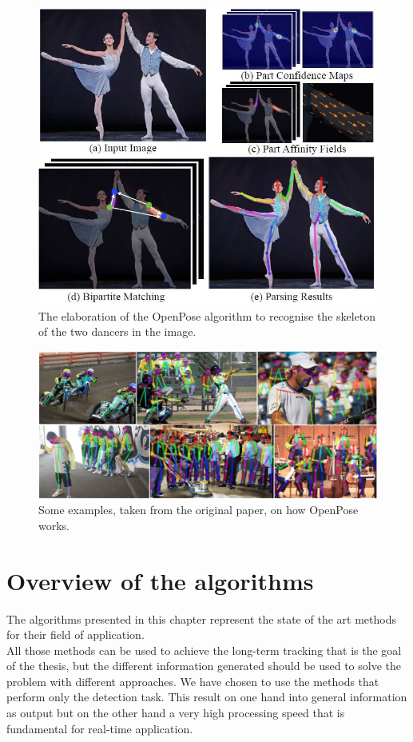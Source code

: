 \begin{figure}[!h]
	\centering
	\includegraphics[width=0.8\linewidth]{images/detection/howItWorks_openpose_2line}
	\caption{The elaboration of the OpenPose algorithm to recognise the skeleton of the two dancers in the image.}
	\label{fig:howItWorks_openpose}
\end{figure}
\begin{figure}[!h]
	\centering
	\includegraphics[width=1\linewidth]{images/detection/ex_openpose_2line}
	\caption{Some examples, taken from the original paper, on how OpenPose works.}
	\label{fig:ex_openpose}
\end{figure}



\section{Overview of the algorithms}
The algorithms presented in this chapter represent the state of the art methods for their field of application.\\
All those methods can be used to achieve the long-term tracking that is the goal of the thesis, but the different information generated should be used to solve the problem with different approaches. We have chosen to use the methods that perform only the detection task. This result on one hand into general information as output but on the other hand a very high processing speed that is fundamental for real-time application.

